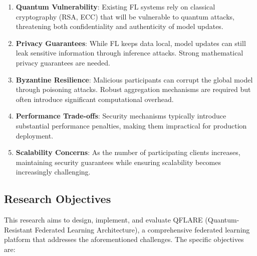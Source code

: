 \documentclass[12pt,a4paper]{article}
\begin{document}
\begin{enumerate}
    \item \textbf{Quantum Vulnerability}: Existing FL systems rely on classical cryptography (RSA, ECC) that will be vulnerable to quantum attacks, threatening both confidentiality and authenticity of model updates.
    
    \item \textbf{Privacy Guarantees}: While FL keeps data local, model updates can still leak sensitive information through inference attacks. Strong mathematical privacy guarantees are needed.
    
    \item \textbf{Byzantine Resilience}: Malicious participants can corrupt the global model through poisoning attacks. Robust aggregation mechanisms are required but often introduce significant computational overhead.
    
    \item \textbf{Performance Trade-offs}: Security mechanisms typically introduce substantial performance penalties, making them impractical for production deployment.
    
    \item \textbf{Scalability Concerns}: As the number of participating clients increases, maintaining security guarantees while ensuring scalability becomes increasingly challenging.
\end{enumerate}

\subsection{Research Objectives}

This research aims to design, implement, and evaluate QFLARE (Quantum-Resistant Federated Learning Architecture), a comprehensive federated learning platform that addresses the aforementioned challenges. The specific objectives are:
\end{document}
